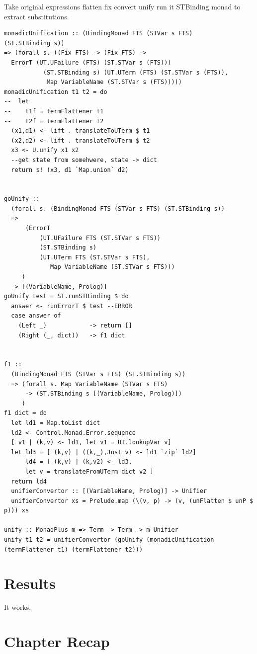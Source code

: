 \documentclass[thesis-solanki.tex]{subfiles}
\begin{document}
Take original expressions flatten fix convert unify
run it STBinding monad to extract substitutions.

\begin{verbatim}
monadicUnification :: (BindingMonad FTS (STVar s FTS)
(ST.STBinding s))
=> (forall s. ((Fix FTS) -> (Fix FTS) ->
  ErrorT (UT.UFailure (FTS) (ST.STVar s (FTS)))
           (ST.STBinding s) (UT.UTerm (FTS) (ST.STVar s (FTS)),
            Map VariableName (ST.STVar s (FTS)))))
monadicUnification t1 t2 = do
--  let
--    t1f = termFlattener t1
--    t2f = termFlattener t2
  (x1,d1) <- lift . translateToUTerm $ t1
  (x2,d2) <- lift . translateToUTerm $ t2
  x3 <- U.unify x1 x2
  --get state from somehwere, state -> dict
  return $! (x3, d1 `Map.union` d2)


goUnify ::
  (forall s. (BindingMonad FTS (STVar s FTS) (ST.STBinding s))
  =>
      (ErrorT
          (UT.UFailure FTS (ST.STVar s FTS))
          (ST.STBinding s)
          (UT.UTerm FTS (ST.STVar s FTS),
             Map VariableName (ST.STVar s FTS)))
     )
  -> [(VariableName, Prolog)]
goUnify test = ST.runSTBinding $ do
  answer <- runErrorT $ test --ERROR
  case answer of
    (Left _)            -> return []
    (Right (_, dict))   -> f1 dict


f1 ::
  (BindingMonad FTS (STVar s FTS) (ST.STBinding s))
  => (forall s. Map VariableName (STVar s FTS)
      -> (ST.STBinding s [(VariableName, Prolog)])
     )
f1 dict = do
  let ld1 = Map.toList dict
  ld2 <- Control.Monad.Error.sequence
  [ v1 | (k,v) <- ld1, let v1 = UT.lookupVar v]
  let ld3 = [ (k,v) | ((k,_),Just v) <- ld1 `zip` ld2]
      ld4 = [ (k,v) | (k,v2) <- ld3,
      let v = translateFromUTerm dict v2 ]
  return ld4
  unifierConvertor :: [(VariableName, Prolog)] -> Unifier
  unifierConvertor xs = Prelude.map (\(v, p) -> (v, (unFlatten $ unP $ p))) xs

unify :: MonadPlus m => Term -> Term -> m Unifier
unify t1 t2 = unifierConvertor (goUnify (monadicUnification (termFlattener t1) (termFlattener t2)))

\end{verbatim}



\section{Results}

It works,



\section{Chapter Recap}
\end{document}
